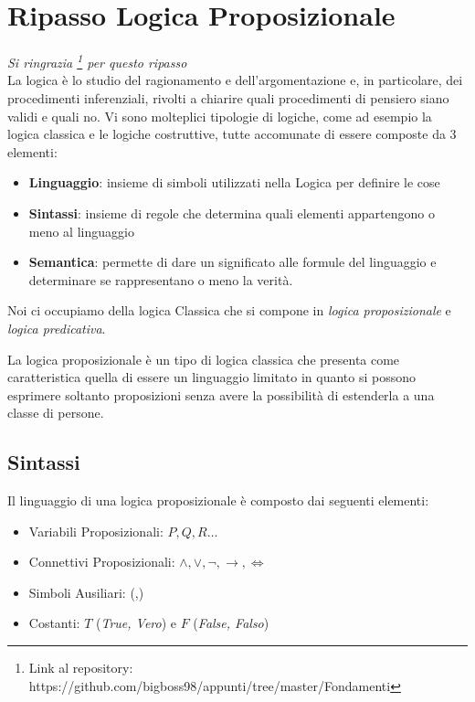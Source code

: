 \documentclass[a4paper,12pt, oneside]{book}
\begin{document}
\section{Ripasso Logica Proposizionale}
\emph{Si ringrazia
  \footnote{Link al repository:
    https://github.com/bigboss98/appunti/tree/master/Fondamenti} per questo
  ripasso}\\   
La logica è lo studio del ragionamento e dell’argomentazione e, in particolare,
dei procedimenti inferenziali, rivolti a chiarire quali	procedimenti di pensiero
siano validi e quali no. Vi sono molteplici tipologie di logiche, come ad
esempio la logica classica e le logiche costruttive, tutte accomunate di essere
composte da 3 elementi: 
\begin{itemize}
  \item \textbf{Linguaggio}: insieme di simboli utilizzati nella Logica per
  definire le cose 
  \item \textbf{Sintassi}: insieme di regole che determina quali elementi
  appartengono o meno al linguaggio 
  \item \textbf{Semantica}: permette di dare un significato alle formule del
  linguaggio e determinare se rappresentano o meno la verità.
\end{itemize}

Noi ci occupiamo della logica Classica che si compone in \textit{logica
  proposizionale} e \textit{logica predicativa}.

La logica proposizionale è un tipo di logica classica che presenta come
caratteristica quella di essere un linguaggio limitato in quanto si possono
esprimere soltanto proposizioni senza avere la possibilità di estenderla a una
classe di persone.
\newpage
\subsection{Sintassi}
Il linguaggio di una logica proposizionale è composto dai seguenti elementi:

\begin{itemize}
  \item Variabili Proposizionali: $P,Q,R \dots$
  \item Connettivi Proposizionali: $\land, \lor, \neg, \rightarrow, \iff$
  \item Simboli Ausiliari: (,)
  \item Costanti: $T$ (\textit{True, Vero}) e $F$ (\textit{False, Falso})
\end{itemize}
\end{document}
